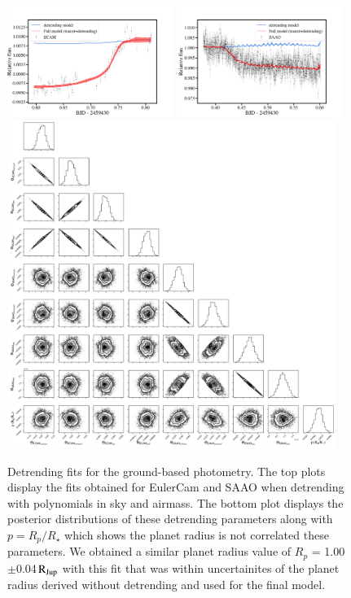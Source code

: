 \documentclass{aa}
\newcommand{\rjup}{\mbox{$\mathrm{R_{\rm Jup}}$}\xspace}
\begin{document}
\begin{appendix}
\begin{figure}
  \centering
  \includegraphics[width=0.48\textwidth]{figures/transit_detrend_ECAM_TIC466206508.pdf}
  \includegraphics[width=0.48\textwidth]{figures/transit_detrend_SAAO_TIC466206508.pdf}
  \includegraphics[width=0.95\textwidth]{figures/corner_correlation_detrend.pdf}
 \caption{Detrending fits for the ground-based photometry. The top plots display the fits obtained for EulerCam and SAAO when detrending with polynomials in sky and airmass. The bottom plot displays the posterior distributions of these detrending parameters along with $p=R_p/R_{\star}$ which shows the planet radius is not correlated these parameters. We obtained a similar planet radius value of $R_{p}$ = 1.00$\pm$0.04\,\rjup with this fit that was within uncertainites of the planet radius derived without detrending and used for the final model.}
  \label{fig:groundphot_detrend}
\end{figure}


\end{appendix}
\end{document}
